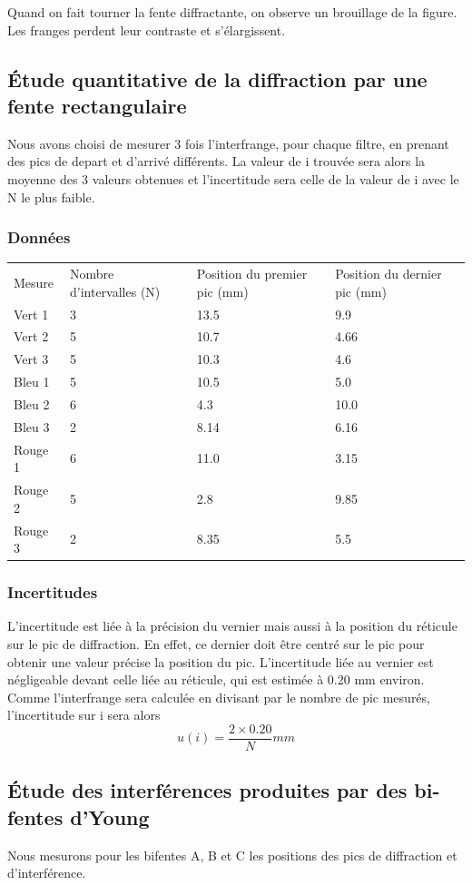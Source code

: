\documentclass[a4paper,9pt,french]{scrartcl}
\begin{document}
Quand on fait tourner la fente diffractante,  on observe un brouillage de la figure. Les franges perdent leur contraste et s'élargissent.


\subsection{Étude quantitative de la diffraction par une fente rectangulaire}
Nous avons choisi de mesurer 3 fois l'interfrange, pour chaque filtre, en prenant des pics de depart et d'arrivé différents. La valeur de i trouvée sera alors la moyenne des 3 valeurs obtenues et l'incertitude sera celle de la valeur de i avec le N le plus faible.
\subsubsection{Données}
\begin{center}
\begin{tabular}{llll}
Mesure & Nombre d'intervalles (N) & Position du premier pic (mm) & Position du dernier pic (mm)\\
Vert 1 & 3 & 13.5 & 9.9\\
Vert 2 & 5 & 10.7 & 4.66\\
Vert 3 & 5 & 10.3 & 4.6\\
Bleu 1 & 5 & 10.5 & 5.0\\
Bleu 2 & 6 & 4.3 & 10.0\\
Bleu 3 & 2 & 8.14 & 6.16\\
Rouge 1 & 6 & 11.0 & 3.15\\
Rouge 2 & 5 & 2.8 & 9.85\\
Rouge 3 & 2 & 8.35 & 5.5
\end{tabular}
\end{center}

\subsubsection{Incertitudes}
L'incertitude est liée à la précision du vernier mais aussi à la position du réticule sur le pic de diffraction. En effet, ce dernier doit \^etre centré sur le pic pour obtenir une valeur précise la position du pic. L'incertitude liée au vernier est négligeable devant celle liée au réticule, qui est estimée à 0.20 mm environ. Comme l'interfrange sera calculée en divisant par le nombre de pic mesurés, l'incertitude sur i sera alors \[u(i) = \frac{2\times 0.20}{N}mm\]
\subsection{Étude des interférences produites par des bi-fentes d'Young}
Nous mesurons pour les bifentes A, B et C les positions des pics de diffraction et d'interférence.
\end{document}
